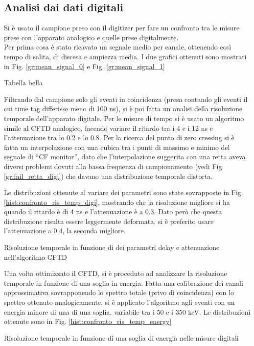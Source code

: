 \subsection{Analisi dai dati digitali}
Si è usato il campione preso con il digitizer per fare un confronto tra le misure prese con l'apparato analogico e quelle prese digitalmente.\\
Per prima cosa è stato ricavato un segnale medio per canale, ottenendo così tempo di salita, di discesa e ampiezza media. I due grafici ottenuti sono mostrati in Fig. \ref{gr:mean_signal_0} e Fig. \ref{gr:mean_signal_1}




Tabella bella

Filtrando dal campione solo gli eventi in coincidenza (presa contando gli eventi il cui time tag differisse meno di 100 ns), si è poi fatta un analisi della risoluzione temporale dell'apparato digitale. Per le misure di tempo si è usato un algoritmo simile al CFTD analogico, facendo variare il ritardo tra i 4 e i 12 ns e l'attenuazione tra lo 0.2 e lo 0.8. Per la ricerca del punto di zero cressing si è fatta un interpolazione con una cubica tra i punti di massimo e minimo del segnale di ``CF monitor'', dato che l'interpolazione suggerita con una retta aveva diversi problemi dovuti alla bassa frequenza di campionamento (vedi Fig. \ref{gr:fail_retta_digi}) che davano una distribuzione temporale distorta.



Le distribuzioni ottenute al variare dei parametri sono state sovrapposte in Fig. \ref{hist:confronto_ris_temp_digi}, mostrando che la risoluzione migliore si ha quando il ritardo è di 4 ns e l'attenuazione è a 0.3. Dato però che questa distribuzione risulta essere leggermente deformata, si è preferito usare l'attenuazione a 0.4, la seconda migliore.



\begin{tabella}[h]
	\centering
	
	\caption{Risoluzione temporale in funzione di dei parametri delay e attenuazione nell'algoritmo CFTD}
	\label{tab:cftd_fwhm_digi}
\end{tabella}

Una volta ottimizzato il CFTD, si è proceduto ad analizzare la risoluzione temporale in funzione di una soglia in energia. Fatta una calibrazione dei canali approssimativa sovrapponendo lo spettro totale (privo di coincidenza) con lo spettro ottenuto analogicamente, si è applicato l'algoritmo agli eventi con un energia minore di una di una soglia, variabile tra i 50 e i 350 keV. Le distribuzioni ottenute sono in Fig. \ref{hist:confronto_ris_temp_energy}



\begin{tabella}[h]
	\centering
	
	\caption{Risoluzione temporale in funzione di una soglia di energia nelle misure digitali}
	\label{tab:threshold_fwhm_digi}
\end{tabella}
